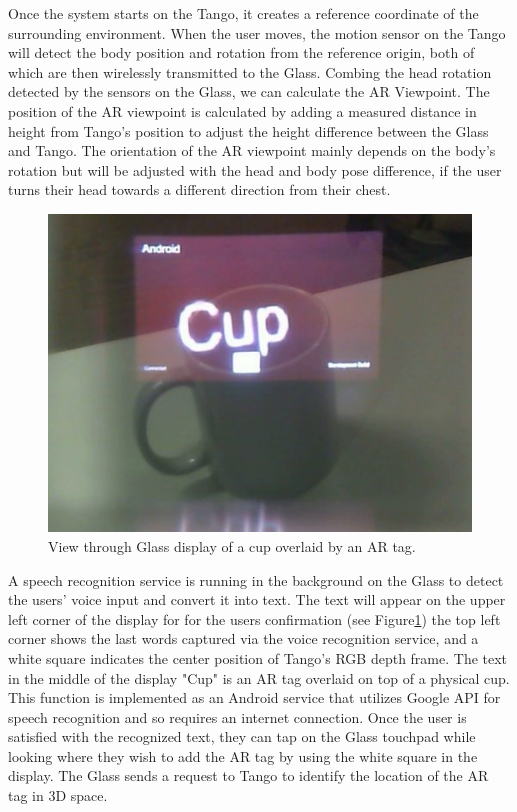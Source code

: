 Once the system starts on the Tango, it creates a reference coordinate of the surrounding environment. When the user moves, the motion sensor on the Tango will detect the body  position and rotation from the reference origin, both of which are then wirelessly transmitted to the Glass. Combing the head rotation detected by the sensors on the Glass, we can calculate the AR Viewpoint. The position of the AR viewpoint is calculated by adding a measured distance in height from Tango's position to adjust the height difference between the Glass and Tango. The orientation of the AR viewpoint mainly depends on the body's rotation but will be adjusted with the head and body pose difference, if the user turns their head towards a different direction from their chest. 

\begin{figure}[ht]
  \centering
  \includegraphics[width=.8\linewidth]{images/mgia15/WIN_20150614_204531_2.jpg}
  \caption{View through Glass display of a cup overlaid by an AR tag.}
  \label{fig:mgia15:ui}
\end{figure}

A speech recognition service is running in the background on the Glass to detect the users' voice input and convert it into text. The text will appear on the upper left corner of the display for for the users confirmation (see Figure\ref{fig:mgia15:ui}) the top left corner shows the last words captured via the voice recognition service, and a white square indicates the center position of Tango's RGB depth frame. The text in the middle of the display "Cup" is an AR tag overlaid on top of a physical cup. This function is implemented as an Android service that utilizes Google API for speech recognition and so requires an internet connection. Once the user is satisfied with the recognized text, they can tap on the Glass touchpad while looking where they wish to add the AR tag by using the white square in the display. The Glass sends a request to Tango to identify the location of the AR tag in 3D space.

